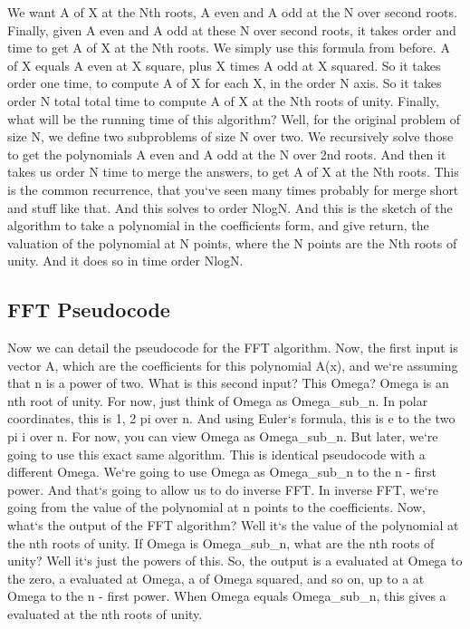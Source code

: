 We want A of X at the Nth roots, A even and A odd at the N over second roots.
Finally, given A even and A odd at these N over second roots, it takes order and time to get A of X at the Nth roots.
We simply use this formula from before.
A of X equals A even at X square, plus X times A odd at X squared.
So it takes order one time, to compute A of X for each X, in the order N axis.
So it takes order N total total time to compute A of X at the Nth roots of unity.
Finally, what will be the running time of this algorithm? Well, for the original problem of size N, we define two subproblems of size N over two.
We recursively solve those to get the polynomials A even and A odd at the N over 2nd roots.
And then it takes us order N time to merge the answers, to get A of X at the Nth roots.
This is the common recurrence, that you`ve seen many times probably for merge short and stuff like that.
And this solves to order NlogN\@.
And this is the sketch of the algorithm to take a polynomial in the coefficients form, and give return, the valuation of the polynomial at N points, where the N points are the Nth roots of unity.
And it does so in time order NlogN\@.

\subsection{FFT  Pseudocode}
Now we can detail the pseudocode for the FFT algorithm.
Now, the first input is vector A, which are the coefficients for this polynomial A(x), and we`re assuming that n is a power of two.
What is this second input? This Omega? Omega is an nth root of unity.
For now, just think of Omega as Omega\_sub\_n.
In polar coordinates, this is 1, 2 pi over n.
And using Euler`s formula, this is e to the two pi i over n.
For now, you can view Omega as Omega\_sub\_n.
But later, we`re going to use this exact same algorithm.
This is identical pseudocode with a different Omega.
We`re going to use Omega as Omega\_sub\_n to the n - first power.
And that`s going to allow us to do inverse FFT\@.
In inverse FFT, we`re going from the value of the polynomial at n points to the coefficients.
Now, what`s the output of the FFT algorithm? Well it`s the value of the polynomial at the nth roots of unity.
If Omega is Omega\_sub\_n, what are the nth roots of unity? Well it`s just the powers of this.
So, the output is a evaluated at Omega to the zero, a evaluated at Omega, a of Omega squared, and so on, up to a at Omega to the n - first power.
When Omega equals Omega\_sub\_n, this gives a evaluated at the nth roots of unity.

